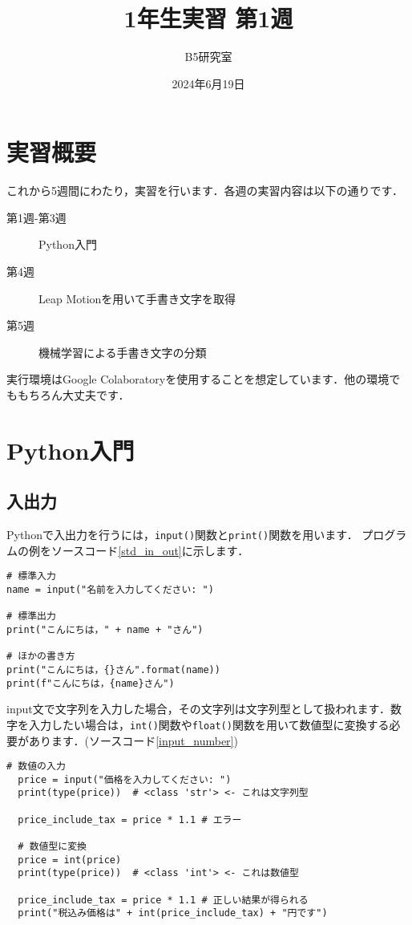 \documentclass{jarticle}
\begin{document}
\title{1年生実習 第1週}
\author{B5研究室}
\date{2024年6月19日}
\maketitle

\section{実習概要}

これから5週間にわたり，実習を行います．各週の実習内容は以下の通りです．

\begin{description}
  \item[第1週-第3週] Python入門
  \item[第4週] Leap Motionを用いて手書き文字を取得
  \item[第5週] 機械学習による手書き文字の分類
\end{description}

実行環境はGoogle Colaboratoryを使用することを想定しています．他の環境でももちろん大丈夫です．

\section{Python入門}
\subsection{入出力}

Pythonで入出力を行うには，\texttt{input()}関数と\texttt{print()}関数を用います．
プログラムの例をソースコード\ref{std_in_out}に示します．
\begin{lstlisting}[caption=入出力,label=std_in_out]
# 標準入力
name = input("名前を入力してください: ")

# 標準出力
print("こんにちは，" + name + "さん")

# ほかの書き方
print("こんにちは，{}さん".format(name))
print(f"こんにちは，{name}さん")
\end{lstlisting}

input文で文字列を入力した場合，その文字列は文字列型として扱われます．数字を入力したい場合は，\texttt{int()}関数や\texttt{float()}関数を用いて数値型に変換する必要があります．(ソースコード\ref{input_number})
\begin{lstlisting}[caption=数値の入力,label=input_number]
  # 数値の入力
  price = input("価格を入力してください: ")
  print(type(price))  # <class 'str'> <- これは文字列型

  price_include_tax = price * 1.1 # エラー

  # 数値型に変換
  price = int(price)
  print(type(price))  # <class 'int'> <- これは数値型

  price_include_tax = price * 1.1 # 正しい結果が得られる
  print("税込み価格は" + int(price_include_tax) + "円です")
  \end{lstlisting}
\end{document}
